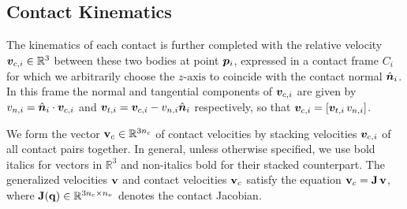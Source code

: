 
\subsection{Contact Kinematics}
\label{sec:contact_modeling}

 The
kinematics of each contact is further completed with the relative velocity
${\bm{v}}_{c,i}\in\mathbb{R}^3$ between these two bodies at point ${\bm{p}}_i$,
expressed in a contact frame $C_i$ for which we arbitrarily choose the
$z\text{-axis}$ to coincide with the contact normal $\hat{{\bm{n}}}_i$. In this
frame the normal and tangential components of ${\bm{v}}_{c,i}$ are given by
$v_{n,i} = \hat{{\bm{n}}}_i\cdot{\bm{v}}_{c,i}$ and ${\bm{v}}_{t,i} =
{\bm{v}}_{c,i}-v_{n,i}\hat{{\bm{n}}}_i$ respectively, so that
${\bm{v}}_{c,i}=[{\bm{v}}_{t,i}\,v_{n,i}]$.

We form the vector ${\mathbf{v}}_{c}\in\mathbb{R}^{3n_c}$ of contact velocities by
stacking velocities ${\bm{v}}_{c,i}$ of all contact pairs together. In general,
unless otherwise specified, we use bold italics for vectors in $\mathbb{R}^3$
and non-italics bold for their stacked counterpart. The generalized velocities
${\mathbf{v}}$ and contact velocities ${\mathbf{v}}_c$ satisfy the equation
${\mathbf{v}}_c={\mathbf{J}}\,{\mathbf{v}}$, where ${\mathbf{J}}({\mathbf{q}})\in\mathbb{R}^{3n_c\times n_v}$
denotes the contact Jacobian.
